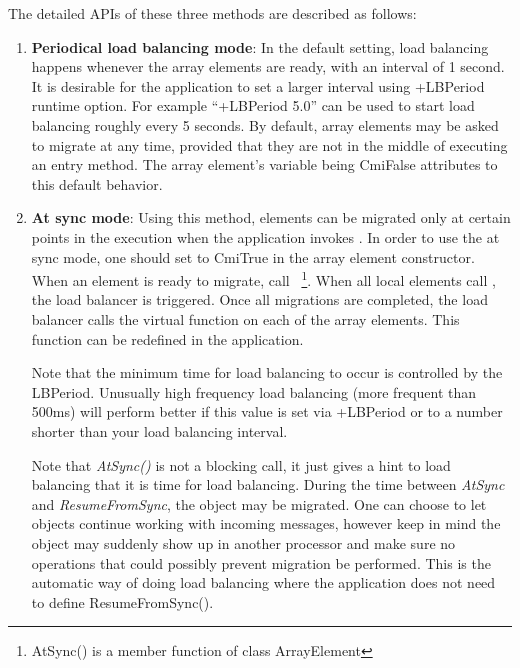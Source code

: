 The detailed APIs of these three methods are described as follows:
%
\begin{enumerate}
%
\item {\bf Periodical load balancing mode}: In the default setting, load
balancing happens whenever the array elements are ready, with an interval of 1
second. It is desirable for the application to set a larger interval using
+LBPeriod runtime option. For example ``+LBPeriod 5.0'' can be used to start load
balancing roughly every 5 seconds. By default, array elements may be asked to
migrate at any time, provided that they are not in the middle of executing an
entry method. The array element's variable  being CmiFalse
attributes to this default behavior.
%
\item {\bf At sync mode}: Using this method, elements can be migrated only at
certain points in the execution when the application invokes . In order to use the at
sync mode, one should set  to CmiTrue in the array element
constructor.  When an element is ready to migrate, call
~\footnote{AtSync() is a member function of class ArrayElement}.
When all local elements call , the load balancer is triggered.  Once
all migrations are completed, the load balancer calls the virtual function
 on each of the array elements. This
function can be redefined in the application.

Note that the minimum time for  load balancing to occur
is controlled by the LBPeriod.  Unusually high frequency load
balancing (more frequent than 500ms) will perform better if this value
is set via +LBPeriod or  to a number shorter than your load
balancing interval.

Note that {\em AtSync()} is not a blocking call, it just gives a hint to load
balancing that it is time for load balancing. During the time between {\em
AtSync} and {\em ResumeFromSync}, the object may be migrated. One can choose
to let objects continue working with incoming messages, however keep in mind
the object may suddenly show up in another processor and make sure no
operations that could possibly prevent migration be performed. This is 
the automatic way of doing load balancing where the application does not need to define ResumeFromSync().


\end{enumerate}
